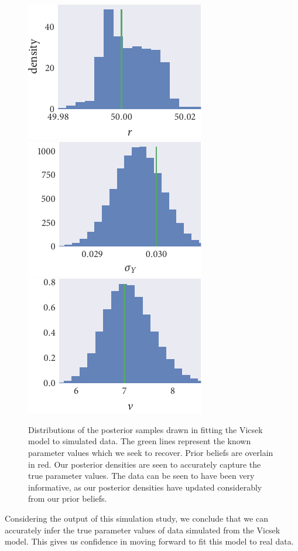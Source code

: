 \begin{figure}[p]
  \includegraphics{r_hist_r.pdf}%
  \includegraphics{r_hist_sigma_Y.pdf}%
  \includegraphics{r_hist_nu.pdf}
  \caption{Distributions of the posterior samples drawn in fitting the Vicsek
      model to simulated data. The green lines represent the known parameter
      values which we seek to recover. Prior beliefs are overlain in red. Our
      posterior densities are seen to accurately capture the true parameter
      values. The data can be seen to have been very informative, as our
      posterior densities have updated considerably from our prior beliefs.}
  \label{fig:vicsek_hist}
\end{figure}

Considering the output of this simulation study, we conclude that we can
accurately infer the true parameter values of data simulated from the Vicsek
model. This gives us confidence in moving forward to fit this model to real
data.


